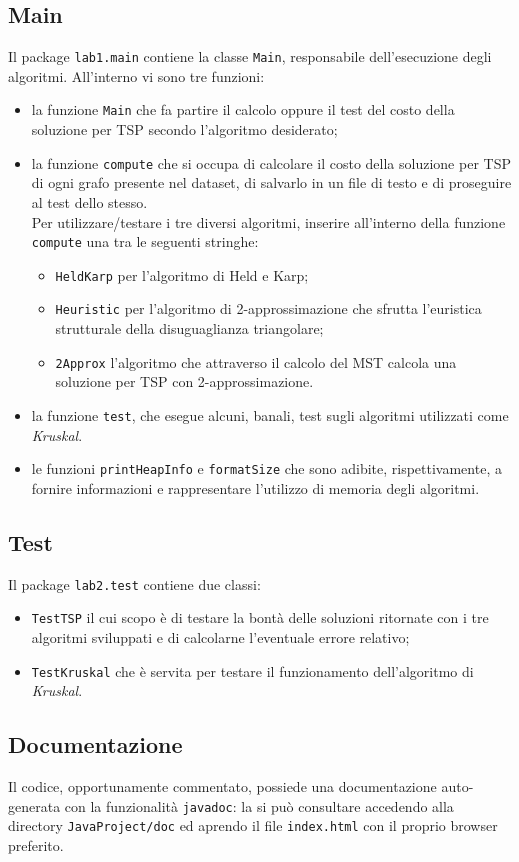 \subsection{Main}
Il package \texttt{lab1.main} contiene la classe \texttt{Main}, responsabile dell'esecuzione degli algoritmi. All'interno vi sono tre funzioni:
\begin{itemize}
	\item la funzione \texttt{Main} che fa partire il calcolo oppure il test del costo della soluzione per TSP secondo l'algoritmo desiderato;
	\item la funzione \texttt{compute} che si occupa di calcolare il costo della soluzione per TSP di ogni grafo presente nel dataset, di salvarlo in un file di testo e di proseguire al test dello stesso.\\
	Per utilizzare/testare i tre diversi algoritmi, inserire all'interno della funzione \texttt{compute} una tra le seguenti stringhe:
	\begin{itemize}
		\item \texttt{HeldKarp} per l'algoritmo di Held e Karp;
		\item \texttt{Heuristic} per l'algoritmo di 2-approssimazione che sfrutta l'euristica strutturale della disuguaglianza triangolare;
		\item \texttt{2Approx} l'algoritmo che attraverso il calcolo del MST calcola una soluzione per TSP con 2-approssimazione.
	\end{itemize}
    \item la funzione \texttt{test}, che esegue alcuni, banali, test sugli algoritmi utilizzati come \textit{Kruskal}.
    \item le funzioni \texttt{printHeapInfo} e \texttt{formatSize} che sono adibite, rispettivamente, a fornire informazioni e rappresentare l'utilizzo di memoria degli algoritmi.
\end{itemize}

\subsection{Test}
Il package \texttt{lab2.test} contiene due classi:
\begin{itemize}
	\item \texttt{TestTSP} il cui scopo è di testare la bontà delle soluzioni ritornate con i tre algoritmi sviluppati e di calcolarne l'eventuale errore relativo;
	\item \texttt{TestKruskal} che è servita per testare il funzionamento dell'algoritmo di \textit{Kruskal}.
\end{itemize}

\subsection{Documentazione}
Il codice, opportunamente commentato, possiede una documentazione auto-generata con la funzionalità \texttt{javadoc}: la si può consultare accedendo alla directory \texttt{JavaProject/doc} ed aprendo il file \texttt{index.html} con il proprio browser preferito. 
